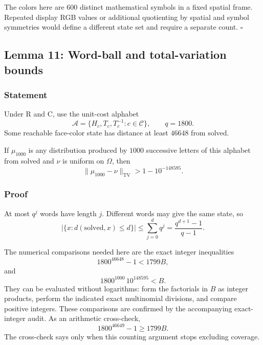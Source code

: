 \documentclass[
  10pt,
  a4paper,
]{article}
\begin{document}
The colors here are \(600\) distinct mathematical symbols in a fixed
spatial frame. Repeated display RGB values or additional quotienting by
spatial and symbol symmetries would define a different state set and
require a separate count. \(\square\)

\subsection{Lemma 11: Word-ball and total-variation
bounds}\label{lemma-11-word-ball-and-total-variation-bounds}

\subsubsection{Statement}\label{statement-10}

Under R and C, use the unit-cost alphabet \begin{equation}
\mathcal A=\{H_c,T_c,T_c^{-1}:c\in\mathcal C\},
\qquad q=1800.
\end{equation} Some reachable face-color state has distance at least
\(46648\) from solved.

If \(\mu_{1000}\) is any distribution produced by \(1000\) successive
letters of this alphabet from solved and \(\nu\) is uniform on
\(\Omega\), then \begin{equation}
\|\mu_{1000}-\nu\|_{\mathrm{TV}}
>1-10^{-148595}.
\end{equation}

\subsubsection{Proof}\label{proof-10}

At most \(q^j\) words have length \(j\). Different words may give the
same state, so \begin{equation}
|\{x:d(\mathrm{solved},x)\le d\}|
\le
\sum_{j=0}^dq^j
=
\frac{q^{d+1}-1}{q-1}.
\end{equation}

The numerical comparisons needed here are the exact integer inequalities
\begin{equation}
1800^{46648}-1<1799B,
\label{eq:blueprint-1}
\end{equation} and \begin{equation}
1800^{1000}\,10^{148595}<B.
\label{eq:blueprint-2}
\end{equation} They can be evaluated without logarithms: form the
factorials in \(B\) as integer products, perform the indicated exact
multinomial divisions, and compare positive integers. These comparisons
are confirmed by the accompanying exact-integer audit. As an arithmetic
cross-check, \begin{equation}
1800^{46649}-1\ge1799B.
\end{equation} The cross-check says only when this counting argument
stops excluding coverage.
\end{document}
